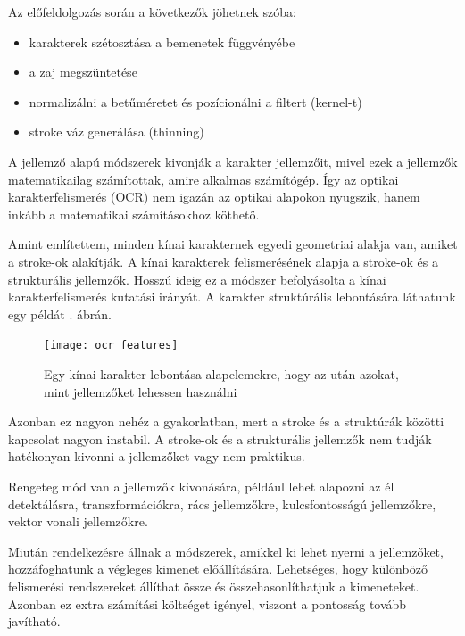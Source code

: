 Az előfeldolgozás \cite{zhou2017stroke} során a következők jöhetnek szóba: 
\begin{itemize}
\item karakterek szétosztása a bemenetek függvényébe
\item a zaj megszüntetése
\item normalizálni a betűméretet és pozícionálni a filtert (kernel-t)
\item stroke váz generálása (thinning)
\end{itemize}

A jellemző alapú módszerek \cite{bunke1997handbook} kivonják a karakter jellemzőit, mivel ezek a jellemzők matematikailag számítottak, amire alkalmas számítógép. Így az optikai karakterfelismerés (OCR) nem igazán az optikai alapokon nyugszik, hanem inkább a matematikai számításokhoz köthető.

Amint említettem, minden kínai karakternek egyedi geometriai alakja van, amiket a stroke-ok alakítják. A kínai karakterek felismerésének alapja a stroke-ok és a strukturális jellemzők. Hosszú ideig ez a módszer befolyásolta a kínai karakterfelismerés kutatási irányát.
A karakter struktúrális lebontására láthatunk egy példát . ábrán.

\begin{figure}[h]
\centering
\texttt{[image: ocr\_features]}
\caption{Egy kínai karakter lebontása alapelemekre, hogy az után azokat, mint jellemzőket lehessen használni}
\label{fig:ocr_features}
\end{figure}

Azonban ez nagyon nehéz a gyakorlatban, mert a stroke és a struktúrák közötti kapcsolat nagyon instabil. A stroke-ok és a strukturális jellemzők nem tudják hatékonyan kivonni a jellemzőket vagy nem praktikus.

Rengeteg mód van \cite{bunke1997handbook} a jellemzők kivonására, például lehet alapozni az él detektálásra, transzformációkra, rács jellemzőkre, kulcsfontosságú jellemzőkre, vektor vonali jellemzőkre.

Miután rendelkezésre állnak a módszerek, amikkel ki lehet nyerni a jellemzőket, hozzáfoghatunk a végleges kimenet előállítására. Lehetséges, hogy különböző felismerési rendszereket \cite{liu2013online} \cite{dong2005improved} \cite{zhong2015high} állíthat össze és összehasonlíthatjuk a kimeneteket. Azonban ez extra számítási költséget igényel, viszont a pontosság tovább javítható.

